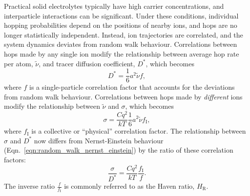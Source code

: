 \documentclass[aps,prb,twocolumn,superscriptaddress,reprint]{revtex4-1}
\newcommand{\hrpa}{{\widetilde{\nu}}}
\newcommand{\m}[1]{\mathrm{#1}}
\begin{document}
Practical solid electrolytes typically have high carrier concentrations, and interparticle interactions can be significant. 
Under these conditions, individual hopping probabilities depend on the positions of nearby ions, and hops are no longer statistically independent. 
Instead, ion trajectories are correlated, and the system dynamics deviates from random walk behaviour.\cite{BardeenAndHerring_Imperfections1952, CompaanAndHaven_TransFaradaySoc1958, AllnattAndLidiard_AtomicTransportInSolids,HowardAndLidiard_RepProgPhys1964} Correlations between hops made by any single ion modify the relationship between average hop rate per atom, $\hrpa$, and tracer diffusion coefficient, $D^*$, which becomes
\begin{equation}
  D^* = \frac{1}{6}a^2\hrpa f,
  \label{eqn:correlated_diffusion}
\end{equation}
where $f$ is a single-particle correlation factor that accounts for the deviations from random walk behaviour. 
Correlations between hops made by \emph{different} ions modify the relationship between $\hrpa$ and $\sigma$, which becomes
\begin{equation}
  \sigma = \frac{Cq^2}{kT}\frac{1}{6}a^2\hrpa f_\m{I},
  \label{eqn:correlated_conductivity}
\end{equation}
where $f_\m{I}$ is a collective or ``physical'' correlation factor.\cite{Mehrer_DiffusionBook, Murch_SolStatIonics1982,SatoAndKikuchi_JChemPhys1971} 
The relationship between $\sigma$ and $D^*$ now differs from Nernst-Einstein behaviour (Eqn.~\ref{eqn:random_walk_nernst_einstein}) by the ratio of these correlation factors:
\begin{equation}
  \frac{\sigma}{D^*} = \frac{Cq^2}{kT}\frac{f_\m{I}}{f}.
  \label{eqn:correlated_nernst_einstein}
\end{equation}
The inverse ratio $\frac{f}{f_\mathrm{I}}$ is commonly referred to as the Haven ratio, $H_\m{R}$\cite{Murch_SolStatIonics1982,Akbar_JApplPhys1994}.
\end{document}

